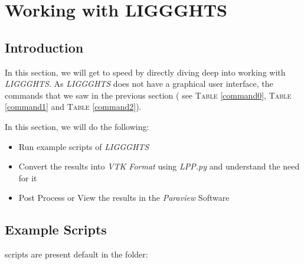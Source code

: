 \documentclass{tufte-book} %
\newcommand{\Li}{\textit{LIGGGHTS}\xspace}
\begin{document}

\chapter{Working with LIGGGHTS}
\label{ch:2}

\section[Introduction]{Introduction}

\begin{fullwidth}
  In this section, we will get to speed by directly diving deep into working with \Li. As \Li does not have a graphical user interface, the commands that we saw in the previous section ( see \textsc{Table} \ref{command0}, \textsc{Table} \ref{command1} and \textsc{Table} \ref{command2}).
  \end{fullwidth}


  In this section, we will do the following:
  \begin{itemize}
  \item Run example scripts of \Li
  \item Convert the results into \textit{VTK Format} using \textit{LPP.py} and understand the need for it
  \item Post Process or View the results in the \textit{Paraview} Software
  
  \end{itemize}

 \section[Example Scripts]{Example Scripts}

  scripts are present default in the folder:
\end{document}
